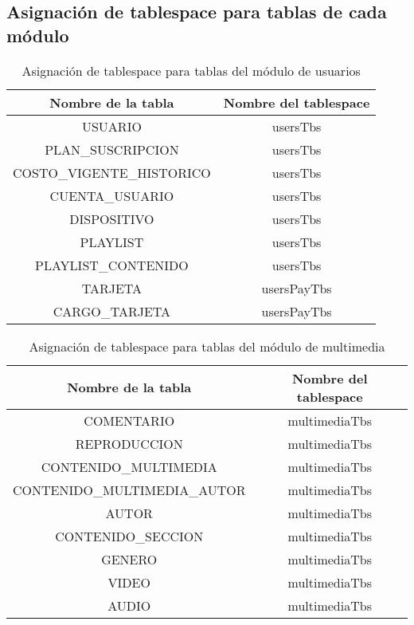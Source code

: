 \documentclass[journal]{IEEEtran}
\begin{document}
\subsection{Asignación de tablespace para tablas de cada módulo}
\begin{table}[H]
  \centering
  \begin{tabular}{|c|c|} 
   \hline
   Nombre de la tabla & Nombre del tablespace \\ [0.1ex] 
   \hline
   USUARIO & usersTbs\\
   \hline
   PLAN\_SUSCRIPCION & usersTbs\\
   \hline
   COSTO\_VIGENTE\_HISTORICO & usersTbs\\
   \hline
   CUENTA\_USUARIO & usersTbs\\
   \hline
   DISPOSITIVO & usersTbs\\
   \hline
   PLAYLIST & usersTbs\\
   \hline
   PLAYLIST\_CONTENIDO & usersTbs\\
   \hline
   TARJETA & usersPayTbs\\
   \hline
   CARGO\_TARJETA & usersPayTbs\\
   \hline
  \end{tabular}
  \caption{Asignación de tablespace para tablas del módulo de usuarios}
  \label{tabla:11}
\end{table}
\begin{table}[H]
  \centering
  \begin{tabular}{|c|c|} 
   \hline
   Nombre de la tabla & Nombre del tablespace \\ [0.1ex] 
   \hline
   COMENTARIO & multimediaTbs\\
   \hline
   REPRODUCCION & multimediaTbs\\
   \hline
   CONTENIDO\_MULTIMEDIA & multimediaTbs\\
   \hline
   CONTENIDO\_MULTIMEDIA\_AUTOR & multimediaTbs\\
   \hline
   AUTOR & multimediaTbs\\
   \hline
   CONTENIDO\_SECCION & multimediaTbs\\
   \hline
   GENERO & multimediaTbs\\
   \hline
   VIDEO & multimediaTbs\\
   \hline
   AUDIO & multimediaTbs\\
   \hline
  \end{tabular}
  \caption{Asignación de tablespace para tablas del módulo de multimedia}
  \label{tabla:12}
\end{table}
\end{document}
